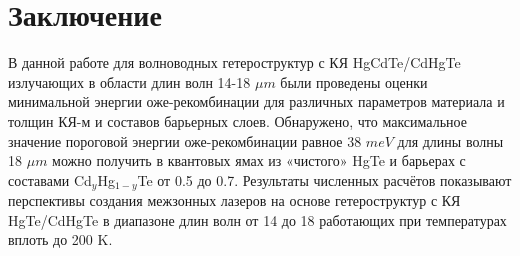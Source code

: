 \documentclass[../main.tex]{subfiles}
\begin{document}
    \chapter{Заключение}

    В данной работе для волноводных гетероструктур с КЯ HgCdTe/CdHgTe излучающих в области длин волн 14-18 $\mu m$ были проведены оценки минимальной
    энергии оже-рекомбинации для различных параметров материала и толщин КЯ-м и составов барьерных слоев. Обнаружено, что 
    максимальное значение пороговой энергии оже-рекомбинации равное 38 $meV$ для длины волны 18 $\mu m$ можно получить в квантовых ямах из «чистого»  
    HgTe и барьерах с составами  Cd${}_{y}$Hg${}_{1-y}$Te от 0.5 до 0.7.  Результаты численных расчётов показывают перспективы создания межзонных лазеров на основе  гетероструктур с 
    КЯ HgTe/CdHgTe в диапазоне длин волн от 14 до 18 работающих при температурах вплоть до 200 K. 
\end{document}
